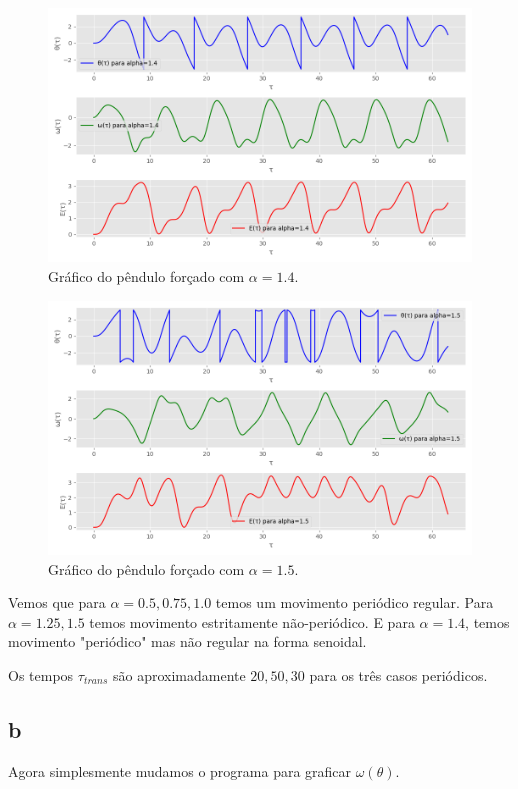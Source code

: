 \documentclass[12pt,a4paper]{article}
\begin{document}
\begin{figure}[H]
\centering
\includegraphics[width=\textwidth]{../tarefa-4a/graficos_alpha_1.4.png}
\caption{Gráfico do pêndulo forçado com $\alpha = 1.4$.}
\end{figure}

\begin{figure}[H]
\centering
\includegraphics[width=\textwidth]{../tarefa-4a/graficos_alpha_1.5.png}
\caption{Gráfico do pêndulo forçado com $\alpha = 1.5$.}
\end{figure}

Vemos que para $\alpha=0.5,0.75,1.0$ temos um movimento periódico regular. Para $\alpha=1.25,1.5$ temos movimento estritamente não-periódico. E para $\alpha=1.4$, temos movimento "periódico" mas não regular na forma senoidal.

Os tempos $\tau_{trans}$ são aproximadamente $20, 50, 30$ para os três casos periódicos.

\subsection{b}
Agora simplesmente mudamos o programa para graficar $\omega(\theta)$.
\end{document}
